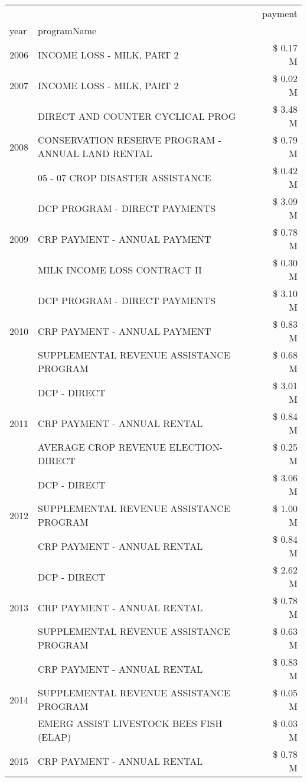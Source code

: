 \begin{tabular}{llr}
\toprule
 &  & payment \\
year & programName &  \\
\midrule
2006 & INCOME LOSS - MILK, PART 2 & \$ 0.17 M \\
\cline{1-3}
2007 & INCOME LOSS - MILK, PART 2 & \$ 0.02 M \\
\cline{1-3}
\multirow[t]{3}{*}{2008} & DIRECT AND COUNTER CYCLICAL PROG & \$ 3.48 M \\
 & CONSERVATION RESERVE PROGRAM - ANNUAL LAND RENTAL & \$ 0.79 M \\
 & 05 - 07 CROP DISASTER ASSISTANCE & \$ 0.42 M \\
\cline{1-3}
\multirow[t]{3}{*}{2009} & DCP PROGRAM - DIRECT PAYMENTS & \$ 3.09 M \\
 & CRP PAYMENT - ANNUAL PAYMENT & \$ 0.78 M \\
 & MILK INCOME LOSS CONTRACT II & \$ 0.30 M \\
\cline{1-3}
\multirow[t]{3}{*}{2010} & DCP PROGRAM - DIRECT PAYMENTS & \$ 3.10 M \\
 & CRP PAYMENT - ANNUAL PAYMENT & \$ 0.83 M \\
 & SUPPLEMENTAL REVENUE ASSISTANCE PROGRAM & \$ 0.68 M \\
\cline{1-3}
\multirow[t]{3}{*}{2011} & DCP - DIRECT & \$ 3.01 M \\
 & CRP PAYMENT - ANNUAL RENTAL & \$ 0.84 M \\
 & AVERAGE CROP REVENUE ELECTION-DIRECT & \$ 0.25 M \\
\cline{1-3}
\multirow[t]{3}{*}{2012} & DCP - DIRECT & \$ 3.06 M \\
 & SUPPLEMENTAL REVENUE ASSISTANCE PROGRAM & \$ 1.00 M \\
 & CRP PAYMENT - ANNUAL RENTAL & \$ 0.84 M \\
\cline{1-3}
\multirow[t]{3}{*}{2013} & DCP - DIRECT & \$ 2.62 M \\
 & CRP PAYMENT - ANNUAL RENTAL & \$ 0.78 M \\
 & SUPPLEMENTAL REVENUE ASSISTANCE PROGRAM & \$ 0.63 M \\
\cline{1-3}
\multirow[t]{3}{*}{2014} & CRP PAYMENT - ANNUAL RENTAL & \$ 0.83 M \\
 & SUPPLEMENTAL REVENUE ASSISTANCE PROGRAM & \$ 0.05 M \\
 & EMERG ASSIST LIVESTOCK BEES FISH (ELAP) & \$ 0.03 M \\
\cline{1-3}
\multirow[t]{3}{*}{2015} & CRP PAYMENT - ANNUAL RENTAL & \$ 0.78 M \\

\end{tabular}
